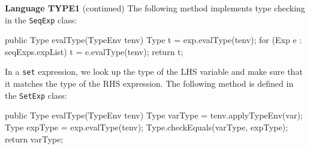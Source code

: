 \begin{minipage}[t]{\sw}
\slidenumber
\LARGE
{\bf Language TYPE1} (continued)\exx
The following method implements type checking in the \verb'SeqExp' class:
\Large
\begin{qv}
    public Type evalType(TypeEnv tenv) {
        Type t = exp.evalType(tenv);
        for (Exp e : seqExps.expList)
            t = e.evalType(tenv);
        return t;
    }
\end{qv}
\LARGE
In a \verb'set' expression,
we look up the type of the LHS variable
and make sure that it matches the type of the RHS expression.
The following method is defined in the \verb'SetExp' class:
\Large
\begin{qv}
    public Type evalType(TypeEnv tenv) {
        Type varType = tenv.applyTypeEnv(var);
        Type expType = exp.evalType(tenv);
        Type.checkEquals(varType, expType);
        return varType;
    }
\end{qv}
\end{minipage}
